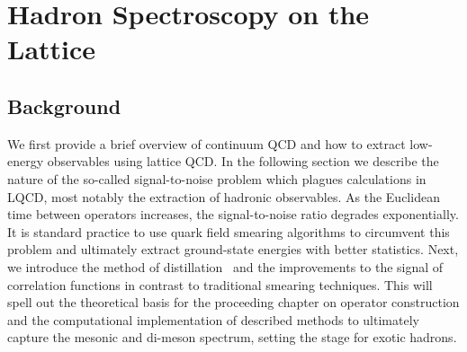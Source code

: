 
\chapter{Hadron Spectroscopy on the Lattice}
\label{sec:spec}
\section{Background}
We first provide a brief overview of continuum QCD and how to extract low-energy observables using lattice QCD. In the following section we describe the nature of the so-called signal-to-noise problem which plagues calculations in LQCD, most notably the extraction of hadronic observables. As the Euclidean time between operators increases, the signal-to-noise ratio degrades exponentially. It is standard practice to use quark field smearing algorithms to circumvent this problem and ultimately extract ground-state energies with better statistics. Next, we introduce the method of distillation~\cite{peardon_novel_2009} and the improvements to the signal of correlation functions in contrast to traditional smearing techniques. This will spell out the theoretical basis for the proceeding chapter on operator construction and the computational implementation of described methods to ultimately capture the mesonic and di-meson spectrum, setting the stage for exotic hadrons. 

